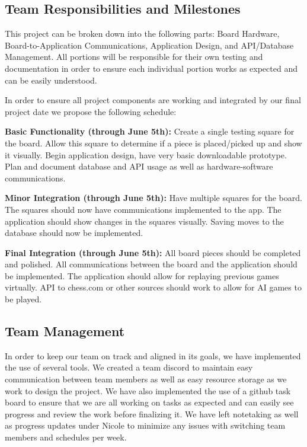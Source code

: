 \documentclass[11pt,journal]{IEEEtran}
\begin{document}
\subsection{Team Responsibilities and Milestones}
This project can be broken down into the following parts: Board Hardware, Board-to-Application Communications, Application Design, and API/Database Management. All portions will be responsible for their own testing and documentation in order to ensure each individual portion works as expected and can be easily understood. 

In order to ensure all project components are working and integrated by our final project date we propose the following schedule:


\textbf{Basic Functionality (through June 5th):} Create a single testing square for the board. Allow this square to determine if a piece is placed/picked up and show it visually. Begin application design, have very basic downloadable prototype. Plan and document database and API usage as well as hardware-software communications.

\textbf{Minor Integration (through June 5th):} Have multiple squares for the board. The squares should now have communications implemented to the app. The application should show changes in the squares visually. Saving moves to the database should now be implemented.

\textbf{Final Integration (through June 5th):} All board pieces should be completed and polished. All communications between the board and the application should be implemented. The application should allow for replaying previous games virtually. API to chess.com or other sources should work to allow for AI games to be played. 

\subsection{Team Management}
In order to keep our team on track and aligned in its goals, we have implemented the use of several tools. We created a team discord to maintain easy communication between team members as well as easy resource storage as we work to design the project. We have also implemented the use of a github task board to ensure that we are all working on tasks as expected and can easily see progress and review the work before finalizing it. We have left notetaking as well as progress updates under Nicole to minimize any issues with switching team members and schedules per week.
\end{document}
